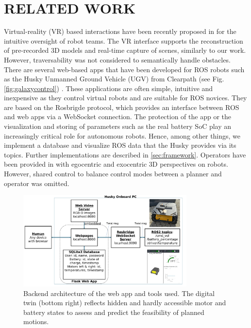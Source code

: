\documentclass[letterpaper, 10 pt, conference]{ieeeconf}  %
\begin{document}
\section{RELATED WORK}

Virtual-reality (VR) based interactions have been recently proposed in \cite{huang2024evaluation} for the intuitive oversight of robot teams. The VR interface supports the reconstruction of pre-recorded 3D models and real-time capture of scenes, similarly to our work. However,  traversability was not considered to semantically handle obstacles. There are several web-based apps that have been developed for ROS robots such as the Husky Unmanned Ground Vehicle (UGV) from Clearpath (see Fig.\ref{fig:galaxycontrol}) \cite{husky}. These applications are often simple, intuitive and inexpensive as they control virtual robots and are suitable for ROS novices.
They are based on the Rosbrigde protocol, which provides an interface between ROS and web apps via a WebSocket connection\cite{kapic,dinodi,rosbridgeOkState,rosbridgeSuite}.
The protection of the app or the visualization and storing of parameters such as the real battery SoC play an increasingly critical role for autonomous robots.
Hence, among other things, we implement a database and visualize ROS data that the Husky provides via its topics.  Further implementations are described in \ref{sec:framework}.
Operators have been provided in \cite{walker2024cyber} with egocentric and exocentric 3D perspectives on robots. However, shared control to balance control modes between a planner and operator was omitted. 

\begin{figure}[b]
	\centerline{\includegraphics[width=8.9cm]{images/ROS_Web_App_Architecture.pdf}}
	\caption{Backend architecture of the web app and tools used. The digital twin (bottom right) reflects hidden and hardly accessible motor and battery states to assess and predict the feasibility of planned motions.}
	\label{fig:userapp}
\end{figure}
\end{document}

